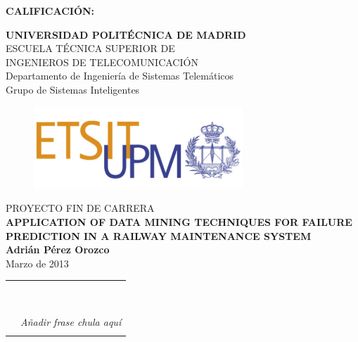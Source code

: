 {\large{\bf CALIFICACIÓN:}}
\pagestyle{empty}
\cleardoublepage
\vspace*{\baselineskip}
\begin{center}
	{\LARGE\rm\textbf{UNIVERSIDAD POLITÉCNICA DE MADRID}\\
	\vspace{1.0cm}
	 ESCUELA TÉCNICA SUPERIOR DE\\ INGENIEROS DE TELECOMUNICACIÓN
	  }  \\

	 {\Large\rm Departamento de Ingeniería de Sistemas Telemáticos\\
	 Grupo de Sistemas Inteligentes  }  \\

\begin{figure}[!htbp]
	\centering
    \includegraphics[width=0.7\textwidth]{img/logo_etsit.jpg}

\end{figure}
	\vspace{1.0cm}
	{{\LARGE\rm PROYECTO FIN DE CARRERA\\
	\vspace{1.0cm}
	 \textbf{ APPLICATION OF DATA MINING TECHNIQUES FOR FAILURE PREDICTION IN A RAILWAY MAINTENANCE SYSTEM} }}  \\
	 \vspace{1.0cm}
     \Large\rm\textbf{Adrián Pérez Orozco}\\
	 \vspace{1.0cm}
	 Marzo de 2013
\end{center}  

\cleardoublepage

\begin{tabular}{p{10cm}p{4cm}}
&\\
&\\
&\\
&\\
&\\
&\\
&\\
&\\
&\\
&\emph{Añadir frase chula aquí}\\
&\\
\end{tabular}